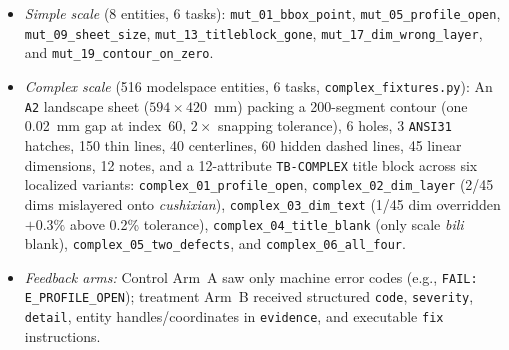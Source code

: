 \documentclass[nocopyright,nolists,upint,varvw,hyphenate]{asmejour}
\begin{document}
\begin{itemize}
\item \emph{Simple scale} (8 entities, 6 tasks): \texttt{mut\_01\_\allowbreak bbox\_point}, \texttt{mut\_05\_\allowbreak profile\_open}, \texttt{mut\_09\_\allowbreak sheet\_size}, \texttt{mut\_13\_\allowbreak titleblock\_gone}, \texttt{mut\_17\_\allowbreak dim\_wrong\_layer}, and \texttt{mut\_19\_\allowbreak contour\_on\_zero}.
\item \emph{Complex scale} (516 modelspace entities, 6 tasks, \texttt{complex\_fixtures.py}): An \texttt{A2} landscape sheet ($594 \times 420$~mm) packing a 200-segment contour (one 0.02~mm gap at index~60, $2\times$ snapping tolerance), 6 holes, 3 \texttt{ANSI31} hatches, 150 thin lines, 40 centerlines, 60 hidden dashed lines, 45 linear dimensions, 12 notes, and a 12-attribute \texttt{TB-COMPLEX} title block across six localized variants: \texttt{complex\_01\_profile\_open}, \texttt{complex\_02\_dim\_layer} (2/45 dims mislayered onto \emph{cushixian}), \texttt{complex\_03\_dim\_text} (1/45 dim overridden $+0.3\%$ above 0.2\% tolerance), \texttt{complex\_04\_title\_blank} (only scale \emph{bili} blank), \texttt{complex\_05\_two\_defects}, and \texttt{complex\_06\_all\_four}.
\item \emph{Feedback arms:} Control Arm~A saw only machine error codes (e.g., \texttt{FAIL: E\_PROFILE\_OPEN}); treatment Arm~B received structured \texttt{code}, \texttt{severity}, \texttt{detail}, entity handles/coordinates in \texttt{evidence}, and executable \texttt{fix} instructions.
\end{itemize}
\end{document}
